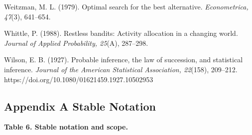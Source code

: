 \documentclass[
  11pt]{article}
\begin{document}
Weitzman, M. L. (1979). Optimal search for the best alternative.
\emph{Econometrica, 47}(3), 641--654.

Whittle, P. (1988). Restless bandits: Activity allocation in a changing
world. \emph{Journal of Applied Probability, 25}(A), 287--298.

Wilson, E. B. (1927). Probable inference, the law of succession, and
statistical inference. \emph{Journal of the American Statistical
Association, 22}(158), 209--212.
https://doi.org/10.1080/01621459.1927.10502953

\endgroup

\newpage

\subsection{Appendix A Stable
Notation}\label{appendix-a-stable-notation}

\textbf{Table 6. Stable notation and scope.}
\end{document}
